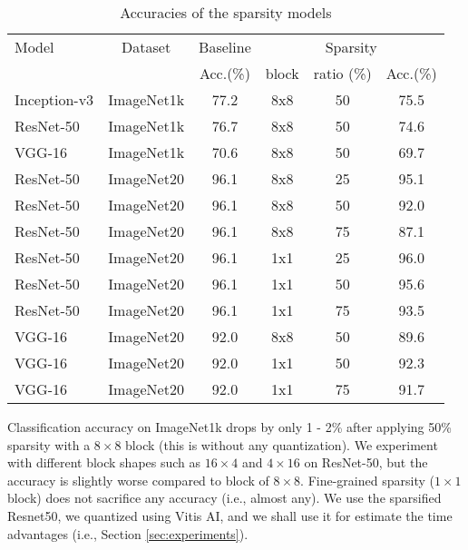 \documentclass[conference]{IEEEtran}
\begin{document}
\begin{table}[ht]
\caption{Accuracies of the sparsity models}
\label{tab_acc}
\begin{center} 
\scalebox{0.9}
{
\begin{tabular}{|l|c|c|c|c|c|}
\hline
\rule[-1ex]{0pt}{3.5ex}  Model & Dataset & Baseline  & \multicolumn{3}{c|}{Sparsity}\\
\rule[-1ex]{0pt}{3.5ex}  {} & {} & Acc.(\%) & block & ratio (\%) & Acc.(\%)    \\\hline\hline
\rule[-1ex]{0pt}{3.5ex}  Inception-v3 & ImageNet1k & 77.2 & 8x8 & 50 & 75.5  \\\hline
\rule[-1ex]{0pt}{3.5ex}  ResNet-50 & ImageNet1k & 76.7 & 8x8 & 50 & 74.6  \\\hline
\rule[-1ex]{0pt}{3.5ex}  VGG-16    & ImageNet1k & 70.6 & 8x8 & 50 & 69.7  \\\hline \hline
\rule[-1ex]{0pt}{3.5ex}  ResNet-50 & ImageNet20 & 96.1 & 8x8 & 25 & 95.1  \\\hline
\rule[-1ex]{0pt}{3.5ex}  ResNet-50 & ImageNet20 & 96.1 & 8x8 & 50 & 92.0  \\\hline
\rule[-1ex]{0pt}{3.5ex}  ResNet-50 & ImageNet20 & 96.1 & 8x8 & 75 & 87.1  \\\hline
\rule[-1ex]{0pt}{3.5ex}  ResNet-50 & ImageNet20 & 96.1 & 1x1 & 25 & 96.0  \\\hline
\rule[-1ex]{0pt}{3.5ex}  ResNet-50 & ImageNet20 & 96.1 & 1x1 & 50 & 95.6  \\\hline
\rule[-1ex]{0pt}{3.5ex}  ResNet-50 & ImageNet20 & 96.1 & 1x1 & 75 & 93.5  \\\hline
\rule[-1ex]{0pt}{3.5ex}  VGG-16    & ImageNet20 & 92.0 & 8x8 & 50 & 89.6  \\\hline
\rule[-1ex]{0pt}{3.5ex}  VGG-16    & ImageNet20 & 92.0 & 1x1 & 50 & 92.3  \\\hline
\rule[-1ex]{0pt}{3.5ex}  VGG-16    & ImageNet20 & 92.0 & 1x1 & 75 & 91.7  \\\hline
\end{tabular}\vspace{-20pt}
}
\end{center}
\end{table}

Classification accuracy on ImageNet1k drops by only 1 - 2\% after
applying 50\% sparsity with a $8\times 8$ block (this is without any
quantization). We experiment with different block shapes such as
$16\times 4$ and $4\times 16$ on ResNet-50, but the accuracy is
slightly worse compared to block of $8\times 8$. Fine-grained sparsity
($1\times 1$ block) does not sacrifice any accuracy (i.e., almost
any).  We use the sparsified Resnet50, we quantized using Vitis AI,
and we shall use it for estimate the time advantages (i.e., Section
\ref{sec:experiments}).
\end{document}
